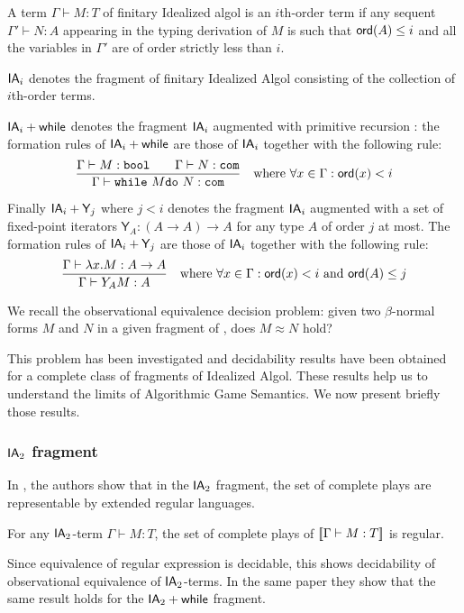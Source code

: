 \begin{dfn}
A term $\Gamma \vdash M:T$ of finitary Idealized algol is an $i$th-order term if any sequent $\Gamma' \vdash N:A$ appearing
in the typing derivation of $M$ is such that ${\sf ord}(A) \leq i$ and all the variables in $\Gamma'$ are of order strictly less than $i$.
\end{dfn}

$\textsf{IA}_i$ denotes the fragment of finitary Idealized Algol
consisting of the collection of $i$th-order terms.

$\textsf{IA}_i + \textsf{while}$ denotes the fragment $\textsf{IA}_i$ augmented with
primitive recursion : the formation rules of $\textsf{IA}_i + \textsf{while}$  are those
of $\textsf{IA}_i$ together with the following rule:
$$  \frac{\displaystyle \Gamma \vdash M : \texttt{bool} \qquad \Gamma \vdash N : \texttt{com}}{\Gamma \vdash \texttt{while}\ M \texttt{do}\ N : \texttt{com} } \quad \mbox{where } \forall x \in \Gamma : {\sf ord}(x) < i $$

Finally $\textsf{IA}_i + \textsf{Y}_j$ where $j
< i$ denotes the fragment $\textsf{IA}_i$ augmented with a set of
fixed-point iterators $\textsf{Y}_A : (A\rightarrow A ) \rightarrow
A$ for any type $A$ of order $j$ at most. The formation rules of $\textsf{IA}_i + \textsf{Y}_j$  are those
of $\textsf{IA}_i$ together with the following rule:
$$  \frac{\displaystyle \Gamma \vdash \lambda x . M : A\rightarrow A}{\Gamma \vdash Y_A M : A} \quad \mbox{where } \forall x \in \Gamma : {\sf ord}(x) < i
                                                                            \mbox{ and } {\sf ord}(A) \leq j $$

We recall the observational equivalence decision problem: given two
$\beta$-normal forms $M$ and $N$ in a given fragment of \ialgol,
does $M \approx N$ hold?

This problem has been investigated and decidability results have
been obtained for a complete class of fragments of Idealized Algol.
These results help us to understand the limits of Algorithmic Game
Semantics. We now present briefly those results.

\subsubsection{$\textsf{IA}_2$ fragment}
In \cite{ghicamccusker00}, the authors show that in the $\textsf{IA}_2$ fragment,
the set of complete plays are representable by extended regular languages.

\begin{lem}
For any $\textsf{IA}_2$-term $\Gamma \vdash M : T$, the set of complete
plays of ${[\![ \Gamma \vdash M : T ]\!]}$ is regular.
\end{lem}
Since equivalence of regular expression is decidable, this shows
decidability of observational equivalence of $\textsf{IA}_2$-terms. In
the same paper they show that the same result holds for the
$\textsf{IA}_2 +\textsf{while}$ fragment.

